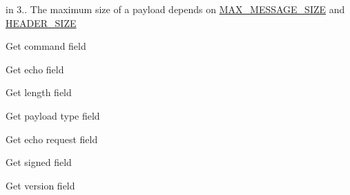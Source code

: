 
\begin{DoxyRefList}
\item[Member \mbox{\hyperlink{group___my_messagegrp_gaa7a7521abb3a3664218d8dc0e3759f0f}{M\+A\+X\+\_\+\+P\+A\+Y\+L\+O\+AD}} ]\label{deprecated__deprecated000001}%
%
in 3.. The maximum size of a payload depends on \mbox{\hyperlink{group___my_messagegrp_gacb84a306ee37479f97cf0b476560f027}{M\+A\+X\+\_\+\+M\+E\+S\+S\+A\+G\+E\+\_\+\+S\+I\+ZE}} and \mbox{\hyperlink{group___my_messagegrp_ga49999be01380f41cc0d0f1f1406fb277}{H\+E\+A\+D\+E\+R\+\_\+\+S\+I\+ZE}}  
\item[Member \mbox{\hyperlink{group___my_messagegrp_gae2370fc35a3e46b0d83d1efeb9947701}{m\+Get\+Command}} (\+\_\+message)]\label{deprecated__deprecated000009}%
%
Get command field  
\item[Member \mbox{\hyperlink{group___my_messagegrp_gaf1ce1507d93af95c147bdb1a468c341a}{m\+Get\+Echo}} (\+\_\+message)]\label{deprecated__deprecated000013}%
%
Get echo field  
\item[Member \mbox{\hyperlink{group___my_messagegrp_ga22feb3db7cf6ae920ef0ea5f6c7a8425}{m\+Get\+Length}} (\+\_\+message)]\label{deprecated__deprecated000007}%
%
Get length field  
\item[Member \mbox{\hyperlink{group___my_messagegrp_ga696696fc18bd9b5a0169a087e5ba3ba0}{m\+Get\+Payload\+Type}} (\+\_\+message)]\label{deprecated__deprecated000015}%
%
Get payload type field  
\item[Member \mbox{\hyperlink{group___my_messagegrp_ga0fc702f74dd1a9af5c4cb2fec27a902c}{m\+Get\+Request\+Echo}} (\+\_\+message)]\label{deprecated__deprecated000011}%
%
Get echo request field  
\item[Member \mbox{\hyperlink{group___my_messagegrp_gaec4a62bad5b760b7ac6b394eab574686}{m\+Get\+Signed}} (\+\_\+message)]\label{deprecated__deprecated000005}%
%
Get signed field  
\item[Member \mbox{\hyperlink{group___my_messagegrp_ga5a5477c94ae3c09292ddbcf73466c59e}{m\+Get\+Version}} (\+\_\+message)]\label{deprecated__deprecated000003}%
%
Get version field  
\item[Member \mbox{\hyperlink{group___my_messagegrp_gaa09c9f8b231c2b886ede119a8888bec2}{m\+Set\+Command}} (\+\_\+message, \+\_\+command)]\label{deprecated__deprecated000008}%

\end{DoxyRefList}
